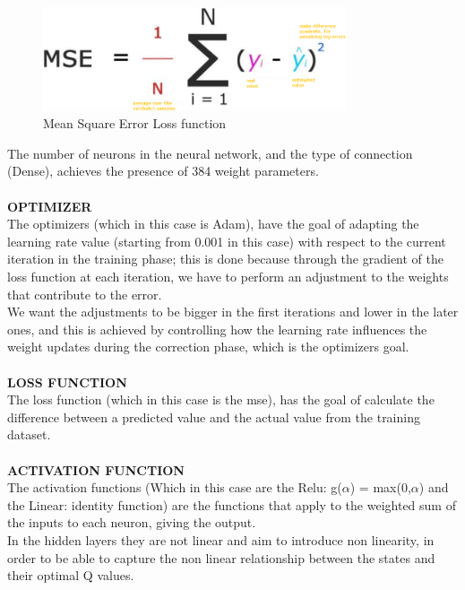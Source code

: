 \documentclass{article}
\begin{document}
\begin{figure}[h]
    \centering
    \includegraphics[width=0.8\textwidth]{Mean_square_error_function.png}
    \caption{Mean Square Error Loss function}
    \label{mse_loss:}

\end{figure}

The number of neurons in the neural network, and the type of connection (Dense), achieves the presence of 384 weight parameters.
\\
\\
\textbf{OPTIMIZER}
\\
The optimizers (which in this case is Adam), have the goal of adapting the learning rate value (starting from 0.001 in this case) with respect to the current iteration in the training phase; this is done because through the gradient of the loss function at each iteration, we have to perform an adjustment to the weights that contribute to the error.
\\
We want the adjustments to be bigger in the first iterations and lower in the later ones, and this is achieved by controlling how the learning rate influences the weight updates during the correction phase, which is the optimizers goal.
\\
\\
\textbf{LOSS FUNCTION}
\\
The loss function (which in this case is the mse), has the goal of calculate the difference between a predicted value and the actual value from the training dataset.
\\
\\
\textbf{ACTIVATION FUNCTION}
\\
The activation functions (Which in this case are the Relu: g($\alpha$) = max(0,$\alpha$) and the Linear: identity function) are the functions that apply to the weighted sum of the inputs to each neuron, giving the output.
\\
In the hidden layers they are not linear and aim to introduce non linearity, in order to be able to capture the non linear relationship between the states and their optimal Q values.
\\
\end{document}
